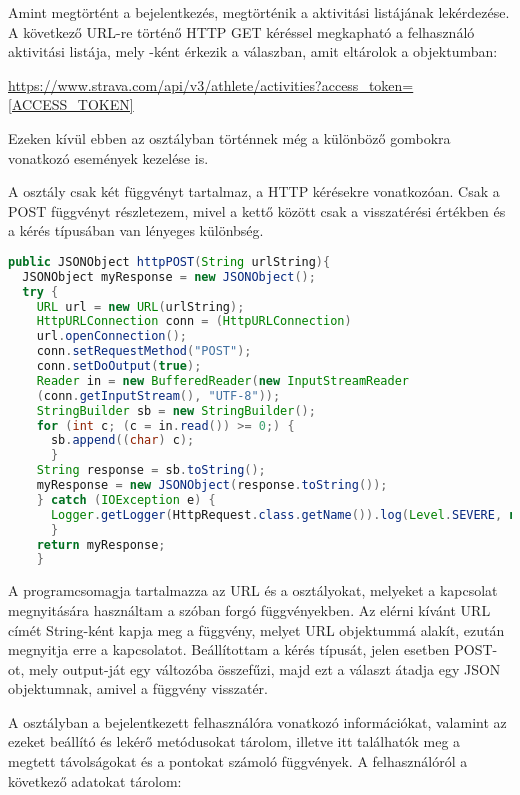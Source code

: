 Amint megtörtént a bejelentkezés, megtörténik a  aktivitási listájának lekérdezése.
A következő URL-re történő HTTP GET kéréssel megkapható a felhasználó aktivitási listája, mely -ként érkezik a válaszban, amit eltárolok a  objektumban:

\url{
https://www.strava.com/api/v3/athlete/activities?access_token=[ACCESS_TOKEN] 
}

Ezeken kívül ebben az osztályban történnek még a különböző gombokra vonatkozó események kezelése is. 

A  osztály csak két függvényt tartalmaz, a HTTP kérésekre vonatkozóan.
Csak a POST függvényt részletezem, mivel a kettő között csak a visszatérési értékben és a kérés típusában van lényeges különbség.


\begin{lstlisting}[language=Java]
public JSONObject httpPOST(String urlString){
  JSONObject myResponse = new JSONObject();
  try {
    URL url = new URL(urlString);
    HttpURLConnection conn = (HttpURLConnection)
    url.openConnection();
    conn.setRequestMethod("POST");
    conn.setDoOutput(true);
    Reader in = new BufferedReader(new InputStreamReader
    (conn.getInputStream(), "UTF-8"));
    StringBuilder sb = new StringBuilder();
    for (int c; (c = in.read()) >= 0;) {
      sb.append((char) c);
      }
    String response = sb.toString();
    myResponse = new JSONObject(response.toString());   
    } catch (IOException e) {
      Logger.getLogger(HttpRequest.class.getName()).log(Level.SEVERE, null, e);
      }
    return myResponse;
    }
\end{lstlisting}


A  programcsomagja tartalmazza az URL és a  osztályokat, melyeket a kapcsolat megnyitására használtam a szóban forgó függvényekben.
Az elérni kívánt URL címét String-ként kapja meg a függvény, melyet URL objektummá alakít, ezután megnyitja erre a kapcsolatot.
Beállítottam a kérés típusát, jelen esetben POST-ot, mely output-ját egy  változóba összefűzi, majd ezt a választ átadja egy JSON objektumnak, amivel a függvény visszatér. 

A  osztályban a bejelentkezett felhasználóra vonatkozó információkat, valamint az ezeket beállító és lekérő metódusokat tárolom, illetve itt találhatók meg a megtett távolságokat és a pontokat számoló függvények.
A felhasználóról a következő adatokat tárolom: 

